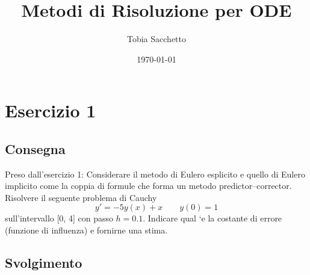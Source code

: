 \documentclass[11pt]{article}
\begin{document}
\title{Metodi di Risoluzione per ODE}

\author{Tobia Sacchetto}
\date{\today}
\maketitle

\section{Esercizio 1}
\subsection{Consegna}
Preso dall'esercizio 1: Considerare il metodo di Eulero esplicito e quello di Eulero implicito come la coppia di formule che forma un metodo predictor–corrector. Risolvere il seguente problema di Cauchy
\[
y'=-5y(x)+x \qquad y(0)=1
\]
sull’intervallo [0, 4] con passo $h = 0.1$. Indicare qual `e la costante di errore
(funzione di influenza) e fornirne una stima.

\subsection{Svolgimento}
\end{document}
